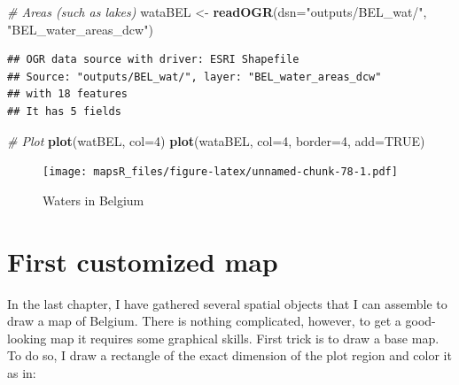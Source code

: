 \documentclass[]{report}
\newenvironment{Shaded}{\begin{snugshade}}{\end{snugshade}}
\newcommand{\KeywordTok}[1]{\textcolor[rgb]{0.13,0.29,0.53}{\textbf{{#1}}}}
\newcommand{\DataTypeTok}[1]{\textcolor[rgb]{0.13,0.29,0.53}{{#1}}}
\newcommand{\DecValTok}[1]{\textcolor[rgb]{0.00,0.00,0.81}{{#1}}}
\newcommand{\FloatTok}[1]{\textcolor[rgb]{0.00,0.00,0.81}{{#1}}}
\newcommand{\StringTok}[1]{\textcolor[rgb]{0.31,0.60,0.02}{{#1}}}
\newcommand{\CommentTok}[1]{\textcolor[rgb]{0.56,0.35,0.01}{\textit{{#1}}}}
\newcommand{\OtherTok}[1]{\textcolor[rgb]{0.56,0.35,0.01}{{#1}}}
\newcommand{\NormalTok}[1]{{#1}}
\begin{document}
\begin{Shaded}
\begin{Highlighting}[]
\CommentTok{# Areas (such as lakes)}
\NormalTok{wataBEL <-}\StringTok{ }\KeywordTok{readOGR}\NormalTok{(}\DataTypeTok{dsn=}\StringTok{"outputs/BEL_wat/"}\NormalTok{, }\StringTok{"BEL_water_areas_dcw"}\NormalTok{)}
\end{Highlighting}
\end{Shaded}

\begin{verbatim}
## OGR data source with driver: ESRI Shapefile 
## Source: "outputs/BEL_wat/", layer: "BEL_water_areas_dcw"
## with 18 features
## It has 5 fields
\end{verbatim}

\begin{Shaded}
\begin{Highlighting}[]
\CommentTok{# Plot}
\KeywordTok{plot}\NormalTok{(watBEL, }\DataTypeTok{col=}\DecValTok{4}\NormalTok{)}
\KeywordTok{plot}\NormalTok{(wataBEL, }\DataTypeTok{col=}\DecValTok{4}\NormalTok{, }\DataTypeTok{border=}\DecValTok{4}\NormalTok{, }\DataTypeTok{add=}\OtherTok{TRUE}\NormalTok{)}
\end{Highlighting}
\end{Shaded}

\begin{figure}[htbp]
\centering
\texttt{[image: mapsR\_files/figure-latex/unnamed-chunk-78-1.pdf]}
\caption{Waters in Belgium}
\end{figure}

\chapter{First customized map}\label{first-customized-map}

In the last chapter, I have gathered several spatial objects that I can
assemble to draw a map of Belgium. There is nothing complicated,
however, to get a good-looking map it requires some graphical skills.
First trick is to draw a base map. To do so, I draw a rectangle of the
exact dimension of the plot region and color it as in:

\begin{Shaded}
\end{Shaded}
\end{document}
